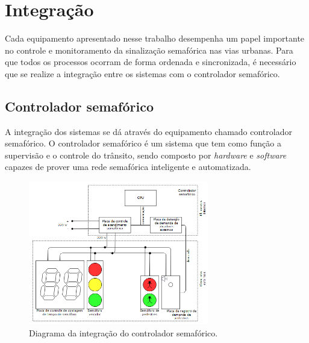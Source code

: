 \chapter{Integração}

Cada equipamento apresentado nesse trabalho desempenha um papel importante no controle e monitoramento da sinalização semafórica nas vias urbanas. Para que todos os processos ocorram de forma ordenada e sincronizada, é necessário que se realize a integração entre os sistemas com o controlador semafórico. 

\section{Controlador semafórico}

A integração dos sistemas se dá através do equipamento chamado controlador semafórico. O controlador semafórico é um sistema que tem como função a supervisão e o controle do trânsito, sendo composto por \textit{hardware} e \textit{software} capazes de prover uma rede semafórica inteligente e automatizada.

\begin{figure}[ht]
    \begin{center}
    \includegraphics[width=0.7\textwidth]{figuras/diagrama_controlador.PNG}
    \end{center}
    \caption[Controlador semafórico]{Diagrama da integração do controlador semafórico.}
    \label{controlador}
\end{figure}


